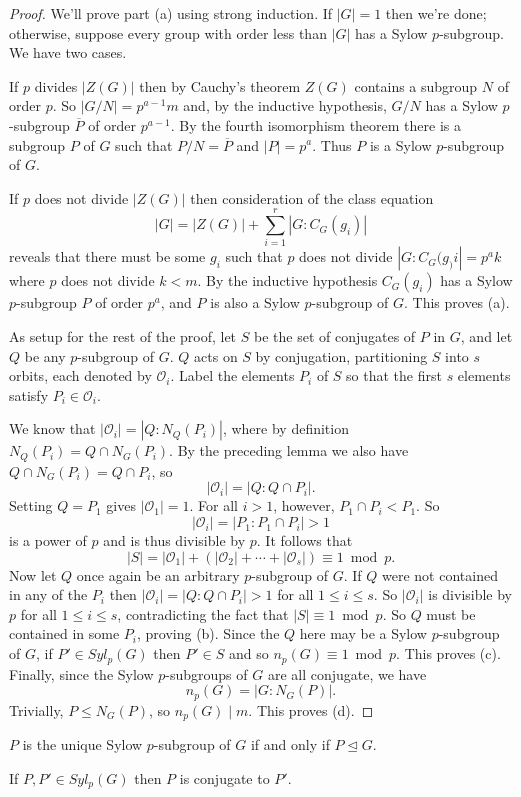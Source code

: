 \documentclass[../m171main.tex]{subfiles}
\begin{document}
\begin{proof}
    We'll prove part (a) using strong induction.
    If $|G| = 1$ then we're done; otherwise, suppose every group with order less than $|G|$ has a Sylow $p$-subgroup.
    We have two cases.

    If $p$ divides $|Z(G)|$ then by Cauchy's theorem $Z(G)$ contains a subgroup $N$ of order $p$.
    So $|G / N| = p^{a-1} m$ and, by the inductive hypothesis, $G / N$ has a Sylow $p$-subgroup $\overline P$ of order $p^{a-1}$.
    By the fourth isomorphism theorem there is a subgroup $P$ of $G$ such that $P / N = \overline P$ and $|P| = p^{a}$.
    Thus $P$ is a Sylow $p$-subgroup of $G$.

    If $p$ does not divide $|Z(G)|$ then consideration of the class equation
    \[ |G| = |Z(G)| + \sum_{i=1}^{r} |G : C_G(g_i)| \]
    reveals that there must be some $g_i$ such that $p$ does not divide $|G : C_G(g_)i| = p^{a} k$ where $p$ does not divide $k < m$.
    By the inductive hypothesis $C_G(g_i)$ has a Sylow $p$-subgroup $P$ of order $p^{a}$, and $P$ is also a Sylow $p$-subgroup of $G$.
    This proves (a).

    As setup for the rest of the proof, let $S$ be the set of conjugates of $P$ in $G$, and let $Q$ be any $p$-subgroup of $G$.
    $Q$ acts on $S$ by conjugation, partitioning $S$ into $s$ orbits, each denoted by $\mathcal O_i$.
    Label the elements $P_i$ of $S$ so that the first $s$ elements satisfy $P_i \in \mathcal O_i$.

    We know that $|\mathcal O_i| = |Q : N_Q(P_i)|$, where by definition $N_Q(P_i) = Q \cap N_G(P_i)$.
    By the preceding lemma we also have $Q \cap N_G(P_i) = Q \cap P_i$, so
    \[ |\mathcal O_i| = |Q : Q \cap P_i|. \]
    Setting $Q = P_1$ gives $|\mathcal O_1| = 1$.
    For all $i > 1$, however, $P_1 \cap P_i < P_1$.
    So
    \[ |\mathcal O_i| = |P_1 : P_1 \cap P_i| > 1 \]
    is a power of $p$ and is thus divisible by $p$.
    It follows that
    \[ |S| = |\mathcal O_1| + (|\mathcal O_2| + \cdots + |\mathcal O_s|) \equiv 1 \bmod p. \]
    Now let $Q$ once again be an arbitrary $p$-subgroup of $G$.
    If $Q$ were not contained in any of the $P_i$ then $|\mathcal O_i| = |Q : Q \cap P_i| > 1$ for all $1 \leq i \leq s$.
    So $|\mathcal O_i|$ is divisible by $p$ for all $1 \leq i \leq s$, contradicting the fact that $|S| \equiv 1 \bmod p$.
    So $Q$ must be contained in some $P_i$, proving (b).
    Since the $Q$ here may be a Sylow $p$-subgroup of $G$, if $P' \in Syl_p(G)$ then $P' \in S$ and so $n_p(G) \equiv 1 \bmod p$.
    This proves (c).
    Finally, since the Sylow $p$-subgroups of $G$ are all conjugate, we have
    \[ n_p(G) = |G : N_G(P)|. \]
    Trivially, $P \leq N_G(P)$, so $n_p(G) \mid m$. This proves (d).
\end{proof}

\begin{corollary}[]
    $P$ is the unique Sylow $p$-subgroup of $G$ if and only if $P \trianglelefteq G$.
\end{corollary}

\begin{corollary}[]
    If $P,P' \in Syl_p(G)$ then $P$ is conjugate to $P'$.
\end{corollary}
\end{document}
